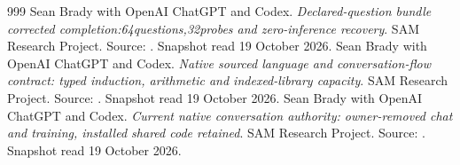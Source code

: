 \begin{thebibliography}{999}
 Sean Brady with OpenAI ChatGPT and Codex. \emph{Declared-question bundle corrected completion:64questions,32probes and zero-inference recovery}. SAM Research Project. Source: . Snapshot read 19 October 2026.
 Sean Brady with OpenAI ChatGPT and Codex. \emph{Native sourced language and conversation-flow contract: typed induction, arithmetic and indexed-library capacity}. SAM Research Project. Source: . Snapshot read 19 October 2026.
 Sean Brady with OpenAI ChatGPT and Codex. \emph{Current native conversation authority: owner-removed chat and training, installed shared code retained}. SAM Research Project. Source: . Snapshot read 19 October 2026.
\end{thebibliography}
\endgroup
